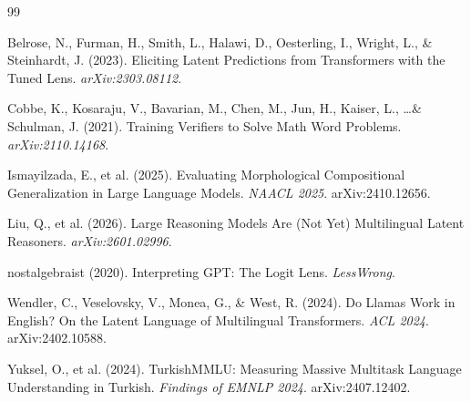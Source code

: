 \documentclass[11pt,a4paper]{article}
\begin{document}
\begin{thebibliography}{99}

Belrose, N., Furman, H., Smith, L., Halawi, D., Oesterling, I., Wright, L., \& Steinhardt, J. (2023).
Eliciting Latent Predictions from Transformers with the Tuned Lens.
\textit{arXiv:2303.08112}.

Cobbe, K., Kosaraju, V., Bavarian, M., Chen, M., Jun, H., Kaiser, L., \ldots \& Schulman, J. (2021).
Training Verifiers to Solve Math Word Problems.
\textit{arXiv:2110.14168}.

Ismayilzada, E., et al. (2025).
Evaluating Morphological Compositional Generalization in Large Language Models.
\textit{NAACL 2025}. arXiv:2410.12656.

Liu, Q., et al. (2026).
Large Reasoning Models Are (Not Yet) Multilingual Latent Reasoners.
\textit{arXiv:2601.02996}.

nostalgebraist (2020).
Interpreting GPT: The Logit Lens.
\textit{LessWrong}.

Wendler, C., Veselovsky, V., Monea, G., \& West, R. (2024).
Do Llamas Work in English? On the Latent Language of Multilingual Transformers.
\textit{ACL 2024}. arXiv:2402.10588.

Yuksel, O., et al. (2024).
TurkishMMLU: Measuring Massive Multitask Language Understanding in Turkish.
\textit{Findings of EMNLP 2024}. arXiv:2407.12402.

\end{thebibliography}
\end{document}
